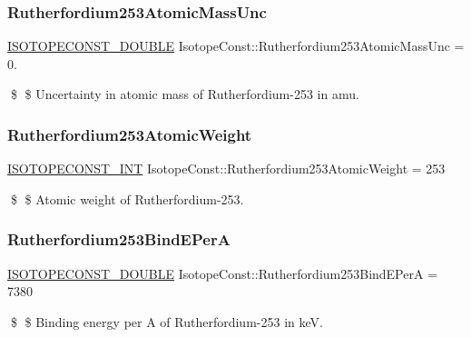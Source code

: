 \subsubsection{\texorpdfstring{Rutherfordium253\+Atomic\+Mass\+Unc}{Rutherfordium253AtomicMassUnc}}
{\footnotesize\ttfamily \mbox{\hyperlink{group___isotope_const-_macros_ga8f45a7272ce02c0b4c65c44636ed719a}{I\+S\+O\+T\+O\+P\+E\+C\+O\+N\+S\+T\+\_\+\+D\+O\+U\+B\+LE}} Isotope\+Const\+::\+Rutherfordium253\+Atomic\+Mass\+Unc = 0.}

\$ \$ Uncertainty in atomic mass of Rutherfordium-\/253 in amu. \mbox{\label{group___isotope_const-_rutherfordium-_rf253_ga9869898ea2400dd6d6688373ab0620bf}} 
\subsubsection{\texorpdfstring{Rutherfordium253\+Atomic\+Weight}{Rutherfordium253AtomicWeight}}
{\footnotesize\ttfamily \mbox{\hyperlink{group___isotope_const-_macros_ga5f18360b3e99483a35c32d789e62621c}{I\+S\+O\+T\+O\+P\+E\+C\+O\+N\+S\+T\+\_\+\+I\+NT}} Isotope\+Const\+::\+Rutherfordium253\+Atomic\+Weight = 253}

\$ \$ Atomic weight of Rutherfordium-\/253. \mbox{\label{group___isotope_const-_rutherfordium-_rf253_ga3da7601ddedf79bc03329d0e7fd3fca7}} 
\subsubsection{\texorpdfstring{Rutherfordium253\+Bind\+E\+PerA}{Rutherfordium253BindEPerA}}
{\footnotesize\ttfamily \mbox{\hyperlink{group___isotope_const-_macros_ga8f45a7272ce02c0b4c65c44636ed719a}{I\+S\+O\+T\+O\+P\+E\+C\+O\+N\+S\+T\+\_\+\+D\+O\+U\+B\+LE}} Isotope\+Const\+::\+Rutherfordium253\+Bind\+E\+PerA = 7380}

\$ \$ Binding energy per A of Rutherfordium-\/253 in keV. \mbox{\label{group___isotope_const-_rutherfordium-_rf253_gaf5b07fdbce5cbaf54c4fee0a973f35c1}} 
